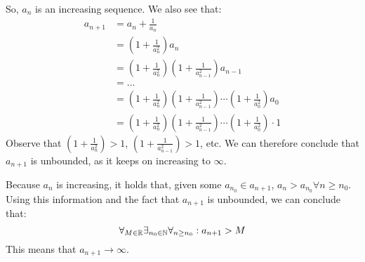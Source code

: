 \documentclass[week=3]{homework}
\begin{document}
\begin{questions}
	    So, $a_n$ is an increasing sequence. 
	    We also see that:
	    \begin{align*}
	    	a_{n+1} &= a_n + \frac{1}{a_n} \\
	    	&= (1 + \frac{1}{a_n^2})a_n \\
	    	&= (1 + \frac{1}{a_n^2})(1 + \frac{1}{a_{n-1}^2})a_{n-1} \\
	    	&= ... \\
	    	&= (1 + \frac{1}{a_n^2})(1 + \frac{1}{a_{n-1}^2}) \cdots (1 + \frac{1}{a_0^2})a_0 \\
	    	&= (1 + \frac{1}{a_n^2})(1 + \frac{1}{a_{n-1}^2}) \cdots (1 + \frac{1}{a_0^2}) \cdot 1
	    \end{align*}
		Observe that $(1 + \frac{1}{a_n^2}) > 1$, $(1 + \frac{1}{a_{n-1}^2}) > 1$, etc. We can therefore conclude that $a_{n+1}$ is unbounded, as it keeps on increasing to $\infty$. 
	    
	    Because $a_n$ is increasing, it holds that, given some $a_{n_0} \in a_{n+1}$, $a_{n} > a_{n_0} \forall n \ge n_0$. Using this information and the fact that $a_{n+1}$ is unbounded, we can conclude that:
	    \[
		    \forall_{M \in \mathbb{R}} \exists_{n_0 \in \mathbb{N}} \forall_{n \ge n_0} : a_{n+1} > M
	    \] 
	    This means that $a_{n+1} \to \infty.$
	    
     \end{questions}
\end{document}
